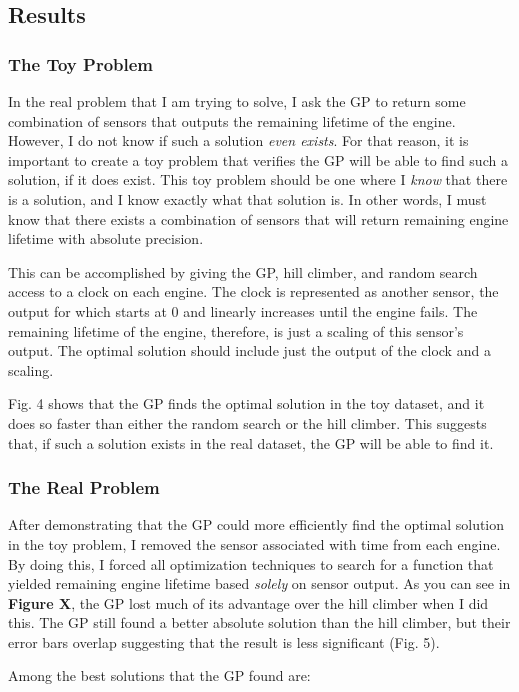 \documentclass{acm_proc_article-sp}
\begin{document}
\subsection{Results}
\subsubsection{The Toy Problem}
In the real problem that I am trying to solve, I ask the GP to return some combination of sensors that outputs the remaining lifetime of the engine. However, I do not know if such a solution {\it{even exists}}. For that reason, it is important to create a toy problem that verifies the GP will be able to find such a solution, if it does exist. This toy problem should be one where I {\it{know}} that there is a solution, and I know exactly what that solution is. In other words, I must know that there exists a combination of sensors that will return remaining engine lifetime with absolute precision.

This can be accomplished by giving the GP, hill climber, and random search access to a clock on each engine. The clock is represented as another sensor, the output for which starts at 0 and linearly increases until the engine fails. The remaining lifetime of the engine, therefore, is just a scaling of this sensor's output. The optimal solution should include just the output of the clock and a scaling.

Fig. 4 shows that the GP finds the optimal solution in the toy dataset, and it does so faster than either the random search or the hill climber. This suggests that, if such a solution exists in the real dataset, the GP will be able to find it.

\subsubsection{The Real Problem}
After demonstrating that the GP could more efficiently find the optimal solution in the toy problem, I removed the sensor associated with time from each engine. By doing this, I forced all optimization techniques to search for a function that yielded remaining engine lifetime based {\it{solely}} on sensor output. As you can see in {\bf{Figure X}}, the GP lost much of its advantage over the hill climber when I did this. The GP still found a better absolute solution than the hill climber, but their error bars overlap suggesting that the result is less significant (Fig. 5).

Among the best solutions that the GP found are:
\end{document}
